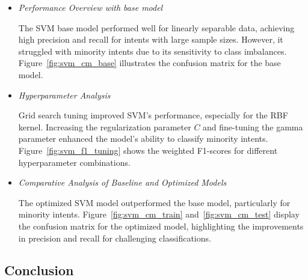             \begin{itemize}
        
                \item \textit{Performance Overview with base model}
                
                    \vspace{0.3em}

                    The SVM base model performed well for linearly separable data, achieving high precision and recall for intents with large sample sizes. However, it struggled with minority intents due to its sensitivity to class imbalances. Figure~\ref{fig:svm_cm_base} illustrates the confusion matrix for the base model.

                \vspace{0.5em}

                \item \textit{Hyperparameter Analysis}
                
                    \vspace{0.3em}

                    Grid search tuning improved SVM's performance, especially for the RBF kernel. Increasing the regularization parameter \( C \) and fine-tuning the gamma parameter enhanced the model's ability to classify minority intents. Figure~\ref{fig:svm_f1_tuning} shows the weighted F1-scores for different hyperparameter combinations.

                \vspace{0.5em}

                \item \textit{Comparative Analysis of Baseline and Optimized Models}
                
                    \vspace{0.3em}

                    The optimized SVM model outperformed the base model, particularly for minority intents. Figure~\ref{fig:svm_cm_train} and~\ref{fig:svm_cm_test} display the confusion matrix for the optimized model, highlighting the improvements in precision and recall for challenging classifications.

            \end{itemize}

    \subsection{Conclusion} %
    
